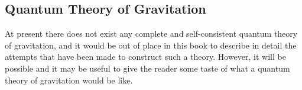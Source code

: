 
\subsection{Quantum Theory of Gravitation\optionalreading}\label{sec:10.8}
\begingroup
\renewcommand{\thefootnote}{*}
\begin{NoHyper}
\end{NoHyper}
\endgroup

At present there does not exist any complete and self-consistent quantum
theory of gravitation, and it would be out of place in this book to describe
in detail the attempts that have been made to construct such a theory.
However, it will be possible and it may be useful to give the reader some
taste of what a quantum theory of gravitation would be like.

